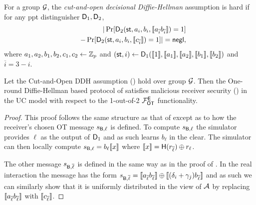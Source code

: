 \begin{definition}\label{def:CODDH}
	For a group $\mathcal{G}$, the \emph{cut-and-open decisional Diffie-Hellman} assumption is hard if for any ppt distinguisher $\mathsf D_1,\mathsf D_2$,
	\begin{eqnarray*}
		&&|\Pr[ \mathsf D_2(\mathsf{st},a_i,b_i,\llbracket a_{\overline{i}}b_{\overline{i}}\rrbracket)=1]\\
		&&-\Pr[ \mathsf D_2(\mathsf{st},a_i,b_i,\llbracket c_{\overline{i}}\rrbracket)=1]|=\mathsf{negl},
	\end{eqnarray*}
	where $a_1,a_2,b_1,b_2,c_1,c_2\leftarrow\mathbb Z_p$ and $(\mathsf{st}, i)\leftarrow\mathsf D_1(\llbracket 1\rrbracket,\llbracket a_1\rrbracket,\llbracket a_2\rrbracket,\llbracket b_1\rrbracket,\llbracket b_2\rrbracket)$ and $\overline i = 3-i$.
\end{definition}

\begin{lemma}
	Let the Cut-and-Open DDH assumption () hold over group $\mathcal{G}$. Then the One-round Diffie-Hellman based protocol  of  satisfies malicious receiver security () in the UC model with respect to the 1-out-of-2 $\mathcal{F}_{\mathsf{OT}}^\mathsf{E}$ functionality.
\end{lemma}
\begin{proof}
	This proof follows the same structure as that of  except as to how the receiver's chosen OT message $s_{\mathsf{B}, \ell}$ is defined. To compute $s_{\mathsf{B}, \ell}$ the simulator provides $\ell$ as the output of $\mathsf D_1$ and as such learns $b_\ell$ in the clear. The simulator can then locally compute $s_{\mathsf{B}, \ell}=b_\ell\llbracket x\rrbracket$ where $\llbracket x\rrbracket=\mathsf{H}(r_{\overline \ell})\oplus r_\ell$. 
	
	The other message $s_{\mathsf{B},\overline \ell}$ is defined in the same way as in the proof of . In the real interaction the message has the form $s_{\mathsf{B},{\overline \ell}}=\llbracket a_{\overline{\ell}}b_{\overline{\ell}}\rrbracket \oplus \llbracket{(\delta_i+\gamma_j)b_{\overline{\ell}}}\rrbracket$ and as such we can similarly show that it is uniformly distributed in the view of $\mathcal{A}$ by replacing $\llbracket a_{\overline{\ell}}b_{\overline{\ell}}\rrbracket$ with $\llbracket c_{\overline{\ell}}\rrbracket$.
\end{proof}